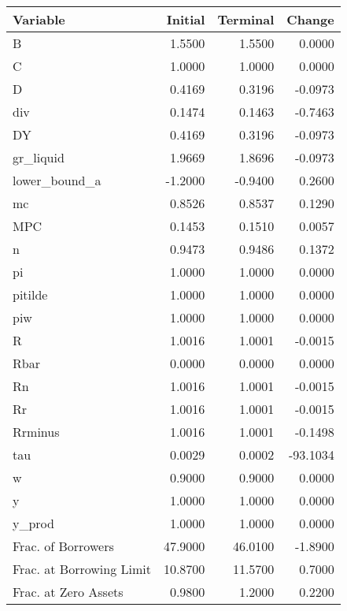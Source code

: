 \begin{table}
\centering
\label{tab:stst}
\begin{tabular}{lrrr}
\toprule
                Variable &  Initial &  Terminal &   Change \\
\midrule
                       B &   1.5500 &    1.5500 &   0.0000 \\
                       C &   1.0000 &    1.0000 &   0.0000 \\
                       D &   0.4169 &    0.3196 &  -0.0973 \\
                     div &   0.1474 &    0.1463 &  -0.7463 \\
                      DY &   0.4169 &    0.3196 &  -0.0973 \\
               gr\_liquid &   1.9669 &    1.8696 &  -0.0973 \\
           lower\_bound\_a &  -1.2000 &   -0.9400 &   0.2600 \\
                      mc &   0.8526 &    0.8537 &   0.1290 \\
                     MPC &   0.1453 &    0.1510 &   0.0057 \\
                       n &   0.9473 &    0.9486 &   0.1372 \\
                      pi &   1.0000 &    1.0000 &   0.0000 \\
                 pitilde &   1.0000 &    1.0000 &   0.0000 \\
                     piw &   1.0000 &    1.0000 &   0.0000 \\
                       R &   1.0016 &    1.0001 &  -0.0015 \\
                    Rbar &   0.0000 &    0.0000 &   0.0000 \\
                      Rn &   1.0016 &    1.0001 &  -0.0015 \\
                      Rr &   1.0016 &    1.0001 &  -0.0015 \\
                 Rrminus &   1.0016 &    1.0001 &  -0.1498 \\
                     tau &   0.0029 &    0.0002 & -93.1034 \\
                       w &   0.9000 &    0.9000 &   0.0000 \\
                       y &   1.0000 &    1.0000 &   0.0000 \\
                  y\_prod &   1.0000 &    1.0000 &   0.0000 \\
      Frac. of Borrowers &  47.9000 &   46.0100 &  -1.8900 \\
Frac. at Borrowing Limit &  10.8700 &   11.5700 &   0.7000 \\
    Frac. at Zero Assets &   0.9800 &    1.2000 &   0.2200 \\
\bottomrule
\end{tabular}
\end{table}
